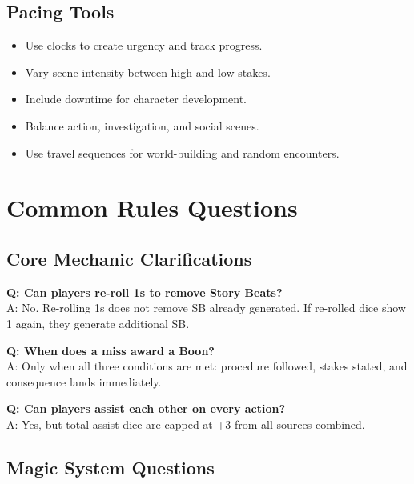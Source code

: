 \subsection{Pacing Tools}
\label{subsec:pacing-tools-ref}

\begin{itemize}
\item Use clocks to create urgency and track progress.
\item Vary scene intensity between high and low stakes.
\item Include downtime for character development.
\item Balance action, investigation, and social scenes.
\item Use travel sequences for world-building and random encounters.
\end{itemize}

\section{Common Rules Questions}
\label{sec:rules-questions}

\subsection{Core Mechanic Clarifications}
\label{subsec:core-clarifications}

\textbf{Q: Can players re-roll 1s to remove Story Beats?}\\
A: No. Re-rolling 1s does not remove SB already generated. If re-rolled dice show 1 again, they generate additional SB.

\textbf{Q: When does a miss award a Boon?}\\
A: Only when all three conditions are met: procedure followed, stakes stated, and consequence lands immediately.

\textbf{Q: Can players assist each other on every action?}\\
A: Yes, but total assist dice are capped at +3 from all sources combined.

\subsection{Magic System Questions}
\label{subsec:magic-questions}

